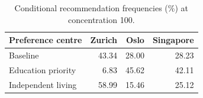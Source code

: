 \begin{table}[htbp]\centering
\caption{Conditional recommendation frequencies (\%) at concentration 100.}
\begin{tabular}{lrrr}\toprule Preference centre & Zurich & Oslo & Singapore\\\midrule
Baseline & 43.34 & 28.00 & 28.23 \\
Education priority & 6.83 & 45.62 & 42.11 \\
Independent living & 58.99 & 15.46 & 25.12 \\
\bottomrule\end{tabular}\end{table}
